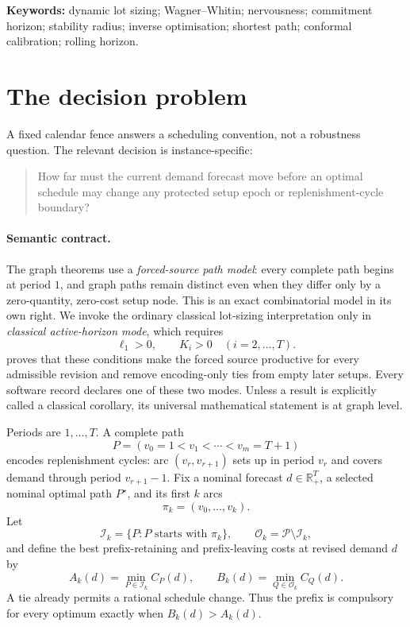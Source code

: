 \documentclass[11pt]{article}
\theoremstyle{definition}
\newcommand{\R}{\mathbb{R}}
\newcommand{\cI}{\mathcal{I}}
\newcommand{\cO}{\mathcal{O}}
\newcommand{\cP}{\mathcal{P}}
\newcommand{\dhat}{\widehat d}
\begin{document}
\noindent\textbf{Keywords:} dynamic lot sizing; Wagner--Whitin; nervousness; commitment horizon; stability radius; inverse optimisation; shortest path; conformal calibration; rolling horizon.

\tableofcontents
\clearpage

\section{The decision problem}\label{sec:decision}

A fixed calendar fence answers a scheduling convention, not a robustness question. The relevant decision is instance-specific:

\begin{quote}
How far must the current demand forecast move before an optimal schedule may change any protected setup epoch or replenishment-cycle boundary?
\end{quote}

\paragraph{Semantic contract.}
The graph theorems use a \emph{forced-source path model}: every complete path begins at period $1$, and graph paths remain distinct even when they differ only by a zero-quantity, zero-cost setup node. This is an exact combinatorial model in its own right. We invoke the ordinary classical lot-sizing interpretation only in \emph{classical active-horizon mode}, which requires
\begin{equation}\label{eq:bridgeconditions}
\ell_1>0,
\qquad
K_i>0\quad(i=2,\ldots,T).
\end{equation}
 proves that these conditions make the forced source productive for every admissible revision and remove encoding-only ties from empty later setups. Every software record declares one of these two modes. Unless a result is explicitly called a classical corollary, its universal mathematical statement is at graph level.

Periods are $1,\ldots,T$. A complete path
\[
P=(v_0=1<v_1<\cdots<v_m=T+1)
\]
encodes replenishment cycles: arc $(v_r,v_{r+1})$ sets up in period $v_r$ and covers demand through period $v_{r+1}-1$. Fix a nominal forecast $\dhat\in\R_+^T$, a selected nominal optimal path $P^\star$, and its first $k$ arcs
\[
\pi_k=(v_0,\ldots,v_k).
\]
Let
\[
\cI_k=\{P:P\text{ starts with }\pi_k\},
\qquad
\cO_k=\cP\setminus\cI_k,
\]
and define the best prefix-retaining and prefix-leaving costs at revised demand $d$ by
\[
A_k(d)=\min_{P\in\cI_k}C_P(d),
\qquad
B_k(d)=\min_{Q\in\cO_k}C_Q(d).
\]
A tie already permits a rational schedule change. Thus the prefix is compulsory for every optimum exactly when $B_k(d)>A_k(d)$.
\end{document}
